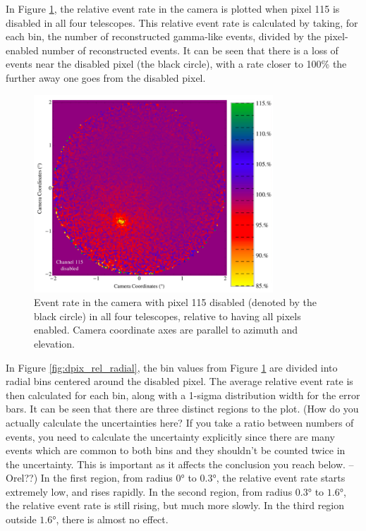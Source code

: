     In Figure \ref{fig:dpix_rel_camera}, the relative event rate in the camera is plotted when pixel 115 is disabled in all four telescopes.
    This relative event rate is calculated by taking, for each bin, the number of reconstructed gamma-like events, divided by the pixel-enabled number of reconstructed events.
    It can be seen that there is a loss of events near the disabled pixel (the black circle), with a rate closer to 100\% the further away one goes from the disabled pixel.

    \begin{figure}[ht]
      \centering
      \includegraphics[width=0.8\textwidth]{images/disabled_pixel/relativerate_camera}
      \caption[Relative Event Rate]{
        Event rate in the camera with pixel 115 disabled (denoted by the black circle) in all four telescopes, relative to having all pixels enabled.
        Camera coordinate axes are parallel to azimuth and elevation.
      }
      \label{fig:dpix_rel_camera}
    \end{figure}

    In Figure \ref{fig:dpix_rel_radial}, the bin values from Figure \ref{fig:dpix_rel_camera} are divided into radial bins centered around the disabled pixel.
    The average relative event rate is then calculated for each bin, along with a 1-sigma distribution width for the error bars.
    It can be seen that there are three distinct regions to the plot.
    {\color{red}(How do you actually calculate the uncertainties here? If you take a ratio between numbers of events, you need to calculate the uncertainty explicitly since there are many events which are common to both bins and they shouldn't be counted twice in the uncertainty.  This is important as it affects the conclusion you reach below. --Orel??)}
    In the first region, from radius $\ang{0}$ to $\ang{0.3}$, the relative event rate starts extremely low, and rises rapidly.
    In the second region, from radius $\ang{0.3}$ to $\ang{1.6}$, the relative event rate is still rising, but much more slowly.
    In the third region outside $\ang{1.6}$, there is almost no effect.

